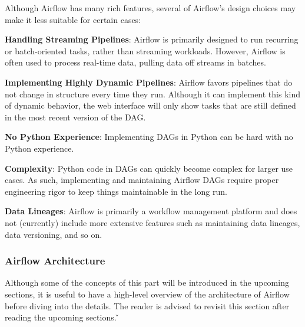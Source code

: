Although Airflow has many rich features, several of Airflow's design choices may make it less suitable for certain cases:
\bit
\item \textbf{Handling Streaming Pipelines}: Airflow is primarily designed to run recurring or batch-oriented tasks,
rather than streaming workloads. However, Airflow is often used to process real-time data, pulling data off streams in
batches.
\item \textbf{Implementing Highly Dynamic Pipelines}: Airflow favors pipelines that do not change in structure every
time they run. Although it can implement this kind of dynamic behavior, the web interface will only show tasks that are
still defined in the most recent version of the DAG\@.
\item \textbf{No Python Experience}: Implementing DAGs in Python can be hard with no Python experience.
\item \textbf{Complexity}: Python code in DAGs can quickly become complex for larger use cases. As such, implementing
and maintaining Airflow DAGs require proper engineering rigor to keep things maintainable in the long run.
\item \textbf{Data Lineages}: Airflow is primarily a workflow management platform and does not (currently) include more
extensive features such as maintaining data lineages, data versioning, and so on.
\eit

\subsubsection{Airflow Architecture}

Although some of the concepts of this part will be introduced in the upcoming sections, it is useful to have a
high-level overview of the architecture of Airflow before diving into the details. The reader is advised to revisit
this section after reading the upcoming sections. \v

